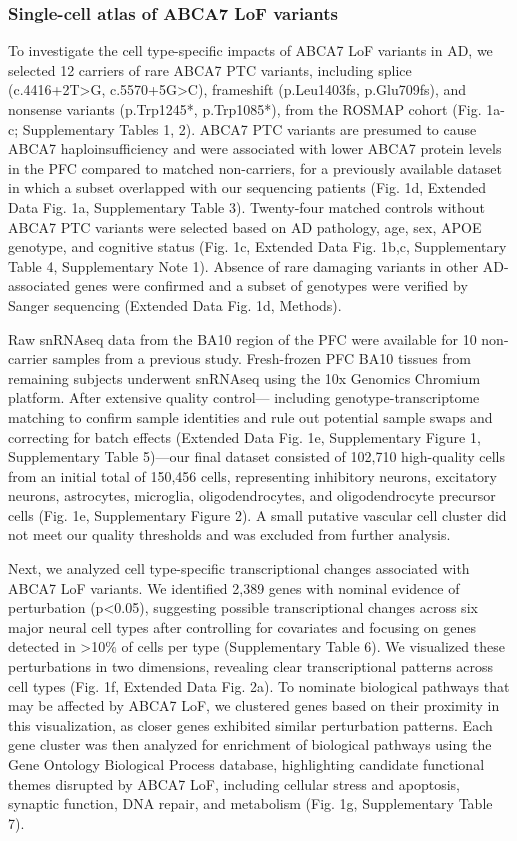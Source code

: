 \subsubsection{Single-cell atlas of ABCA7 LoF variants}
To investigate the cell type-specific impacts of ABCA7 LoF variants in AD, we selected 12 carriers of rare ABCA7 PTC variants, including splice (c.4416+2T>G, c.5570+5G>C), frameshift (p.Leu1403fs, p.Glu709fs), and nonsense variants (p.Trp1245*, p.Trp1085*), from the ROSMAP cohort (Fig. 1a-c; Supplementary Tables 1, 2). ABCA7 PTC variants are presumed to cause ABCA7 haploinsufficiency and were associated with lower ABCA7 protein levels in the PFC compared to matched non-carriers, for a previously available dataset in which a subset overlapped with our sequencing patients (Fig. 1d, Extended Data Fig. 1a, Supplementary Table 3). Twenty-four matched controls without ABCA7 PTC variants were selected based on AD pathology, age, sex, APOE genotype, and cognitive status (Fig. 1c, Extended Data Fig. 1b,c, Supplementary Table 4, Supplementary Note 1). Absence of rare damaging variants in other AD-associated genes\supercite{Holstege2022-vp} were confirmed and a subset of genotypes were verified by Sanger sequencing (Extended Data Fig. 1d, Methods).

Raw snRNAseq data from the BA10 region of the PFC were available for 10 non-carrier samples from a previous study\supercite{Mathys2019-wb}. Fresh-frozen PFC BA10 tissues from remaining subjects underwent snRNAseq using the 10x Genomics Chromium platform. After extensive quality control— including genotype-transcriptome matching to confirm sample identities and rule out potential sample swaps and correcting for batch effects (Extended Data Fig. 1e, Supplementary Figure 1, Supplementary Table 5)—our final dataset consisted of 102,710 high-quality cells from an initial total of 150,456 cells, representing inhibitory neurons, excitatory neurons, astrocytes, microglia, oligodendrocytes, and oligodendrocyte precursor cells (Fig. 1e, Supplementary Figure 2). A small putative vascular cell cluster did not meet our quality thresholds and was excluded from further analysis.

Next, we analyzed cell type-specific transcriptional changes associated with ABCA7 LoF variants. We identified 2,389 genes with nominal evidence of perturbation (p<0.05), suggesting possible transcriptional changes across six major neural cell types after controlling for covariates and focusing on genes detected in >10\% of cells per type (Supplementary Table 6). We visualized these perturbations in two dimensions, revealing clear transcriptional patterns across cell types (Fig. 1f, Extended Data Fig. 2a). To nominate biological pathways that may be affected by ABCA7 LoF, we clustered genes based on their proximity in this visualization, as closer genes exhibited similar perturbation patterns. Each gene cluster was then analyzed for enrichment of biological pathways using the Gene Ontology Biological Process database, highlighting candidate functional themes disrupted by ABCA7 LoF, including cellular stress and apoptosis, synaptic function, DNA repair, and metabolism (Fig. 1g, Supplementary Table 7).

